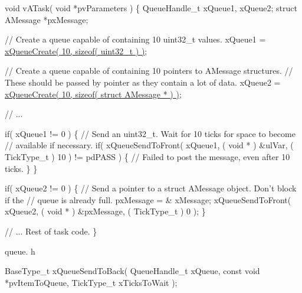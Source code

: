 \begin{DoxyPre}void vATask( void *pvParameters )
\{
QueueHandle\_t xQueue1, xQueue2;
struct AMessage *pxMessage;\end{DoxyPre}



\begin{DoxyPre} // Create a queue capable of containing 10 uint32\_t values.
 xQueue1 = \hyperlink{vendor_2ceedling_2plugins_2freertos_2src_2freertos_2include_2queue_8h_aeb858b824bd74a934ea7ebb81af2a6bb}{xQueueCreate( 10, sizeof( uint32\_t ) )};\end{DoxyPre}



\begin{DoxyPre} // Create a queue capable of containing 10 pointers to AMessage structures.
 // These should be passed by pointer as they contain a lot of data.
 xQueue2 = \hyperlink{vendor_2ceedling_2plugins_2freertos_2src_2freertos_2include_2queue_8h_aeb858b824bd74a934ea7ebb81af2a6bb}{xQueueCreate( 10, sizeof( struct AMessage * ) )};\end{DoxyPre}



\begin{DoxyPre} // ...\end{DoxyPre}



\begin{DoxyPre} if( xQueue1 != 0 )
 \{
     // Send an uint32\_t.  Wait for 10 ticks for space to become
     // available if necessary.
     if( xQueueSendToFront( xQueue1, ( void * ) \&ulVar, ( TickType\_t ) 10 ) != pdPASS )
     \{
         // Failed to post the message, even after 10 ticks.
     \}
 \}\end{DoxyPre}



\begin{DoxyPre} if( xQueue2 != 0 )
 \{
     // Send a pointer to a struct AMessage object.  Don't block if the
     // queue is already full.
     pxMessage = \& xMessage;
     xQueueSendToFront( xQueue2, ( void * ) \&pxMessage, ( TickType\_t ) 0 );
 \}\end{DoxyPre}



\begin{DoxyPre} // ... Rest of task code.
\}
\end{DoxyPre}


queue. h 
\begin{DoxyPre}
BaseType\_t xQueueSendToBack(
                                QueueHandle\_t    xQueue,
                                const void       *pvItemToQueue,
                                TickType\_t       xTicksToWait
                            );
\end{DoxyPre}


